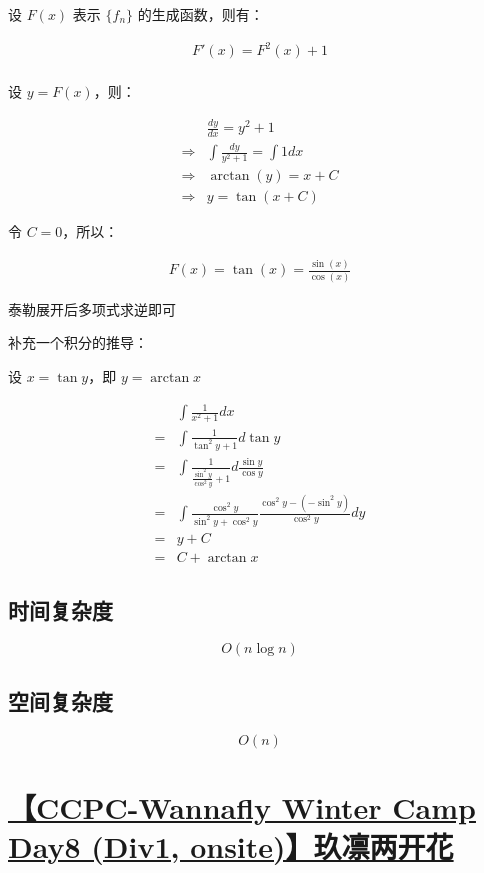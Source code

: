 \documentclass[UTF8]{article}
\begin{document}
设 $F(x)$ 表示 $\{f_n\}$ 的生成函数，则有：

$$
\begin{aligned}
F'(x)=F^2(x)+1 \\
\end{aligned}
$$

设 $y=F(x)$，则：

$$
\begin{aligned}
& \frac{dy}{dx}=y^2+1 \\
\Rightarrow & \int \frac{dy}{y^2+1}=\int 1 dx \\
\Rightarrow & \arctan(y)=x+C \\
\Rightarrow & y=\tan(x+C)
\end{aligned}
$$

令 $C=0$，所以：

$$
\begin{aligned}
F(x)=\tan(x)=\frac{\sin(x)}{\cos(x)}
\end{aligned}
$$

泰勒展开后多项式求逆即可

补充一个积分的推导：

设 $x=\tan y$，即 $y=\arctan x$

$$
\begin{aligned}
&\int \frac{1}{x^2+1}dx \\
=&\int \frac{1}{\tan^2y+1}d \tan y \\
=&\int \frac{1}{\frac{\sin^2y}{\cos^2y}+1}d \frac{\sin y }{\cos y} \\
=&\int \frac{\cos^2y}{\sin^2y+\cos^2y} \frac{\cos^2y-(-\sin^2y)}{\cos^2y}dy\\
=&y+C \\
=&C+\arctan x
\end{aligned}
$$

\subsection{时间复杂度}

$$
O(n \log n)
$$

\subsection{空间复杂度}

$$
O(n)
$$

\section{\href{https://www.zhixincode.com/contest/28/problem/B?problem_id=405}{【CCPC-Wannafly Winter Camp Day8 (Div1, onsite)】玖凛两开花}}
\end{document}
